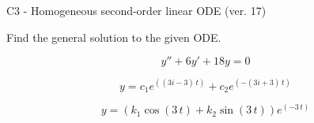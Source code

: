 \begin{exercise}
  \begin{exerciseTitle}C3 - Homogeneous second-order linear ODE (ver. 17)\end{exerciseTitle}
  \begin{exerciseStatement}
    
Find the general solution to the given ODE.

    
\[y''+6y'+18y = 0\]

  \end{exerciseStatement}
  \begin{exerciseAnswer}
    
\[y= c_{1} e^{\left(\left(3 i - 3\right) \, t\right)} + c_{2} e^{\left(-\left(3 i + 3\right) \, t\right)}\]

    
\[y= {\left(k_{1} \cos\left(3 \, t\right) + k_{2} \sin\left(3 \, t\right)\right)} e^{\left(-3 \, t\right)}\]

  \end{exerciseAnswer}
\end{exercise}